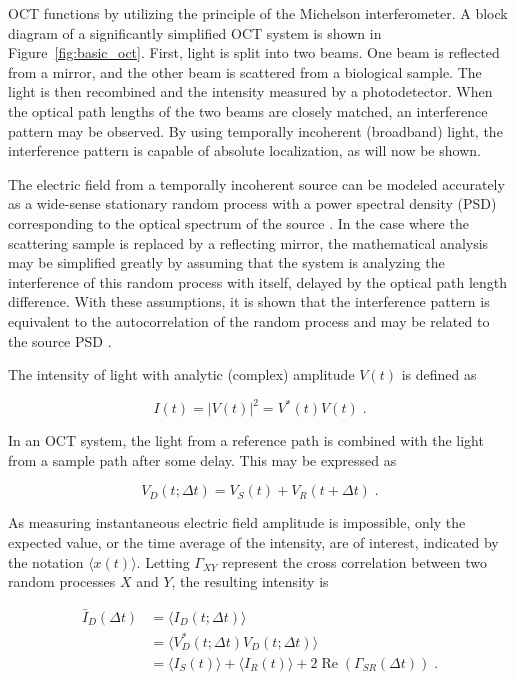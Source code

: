 OCT functions by utilizing the principle of the Michelson interferometer. A block diagram of a significantly simplified OCT system is shown in Figure~\ref{fig:basic_oct}. First, light is split into two beams. One beam is reflected from a mirror, and the other beam is scattered from a biological sample. The light is then recombined and the intensity measured by a photodetector. When the optical path lengths of the two beams are closely matched, an interference pattern may be observed. By using temporally incoherent (broadband) light, the interference pattern is capable of absolute localization, as will now be shown.

The electric field from a temporally incoherent source can be modeled accurately as a wide-sense stationary random process with a power spectral density (PSD) corresponding to the optical spectrum of the source \cite{bouma}. In the case where the scattering sample is replaced by a reflecting mirror, the mathematical analysis may be simplified greatly by assuming that the system is analyzing the interference of this random process with itself, delayed by the optical path length difference. With these assumptions, it is shown that the interference pattern is equivalent to the autocorrelation of the random process and may be related to the source PSD \cite{fercher}.

The intensity of light with analytic (complex) amplitude $V(t)$ is defined as

\begin{equation}
I(t) = |V(t)|^2 = V^*(t)V(t) \; .
\end{equation}

In an OCT system, the light from a reference path is combined with the light from a sample path after some delay. This may be expressed as

\begin{equation}
V_D(t; \Delta t) = V_S(t) + V_R(t + \Delta t) \; .
\end{equation}

As measuring instantaneous electric field amplitude is impossible, only the expected value, or the time average of the intensity, are of interest, indicated by the notation $\langle x(t) \rangle$. Letting $\Gamma_{XY}$ represent the cross correlation between two random processes $X$ and $Y$, the resulting intensity is

\begin{equation}
\begin{aligned}
\bar{I}_D(\Delta t) & =  \langle I_D(t; \Delta t) \rangle \\
& =  \langle V^*_D(t; \Delta t) V_D(t; \Delta t) \rangle \\
& =  \langle I_S(t) \rangle + \langle I_R(t) \rangle + 2 \operatorname{Re} (\Gamma_{SR} (\Delta t) ) \; .
\end{aligned}
\end{equation}

